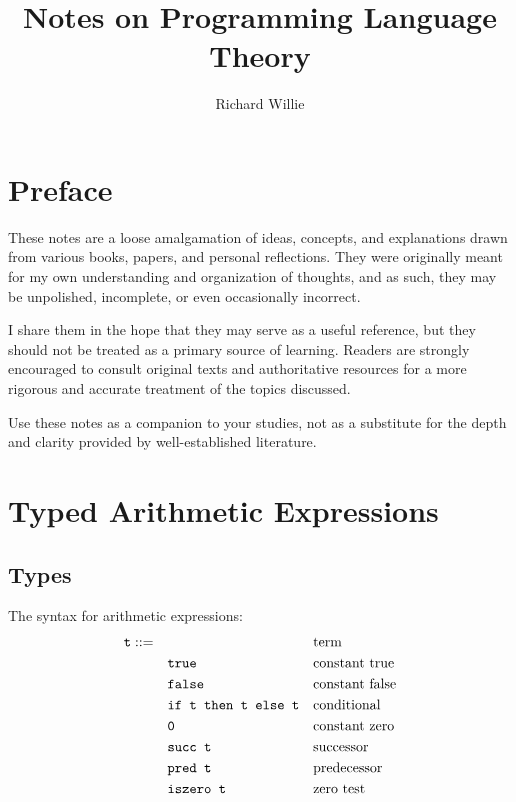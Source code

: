 \documentclass[11pt,twoside=off,numbers=noenddot]{scrbook}
\title{Notes on Programming Language Theory}
\author{Richard Willie}
\begin{document}
\maketitle

\chapter*{Preface}
These notes are a loose amalgamation of ideas, concepts, and
explanations drawn from various books, papers, and personal
reflections. They were originally meant for my own understanding and
organization of thoughts, and as such, they may be unpolished,
incomplete, or even occasionally incorrect.

I share them in the hope that they may serve as a useful reference,
but they should not be treated as a primary source of learning.
Readers are strongly encouraged to consult original texts and
authoritative resources for a more rigorous and accurate treatment of
the topics discussed.

Use these notes as a companion to your studies, not as a substitute
for the depth and clarity provided by well-established literature.

\tableofcontents

\newpage

\chapter{Typed Arithmetic Expressions}

\section{Types}
The syntax for arithmetic expressions:
\begin{align*}
  \texttt{t} ::= & \quad && \text{term} \\
  & \quad \texttt{true} && \text{constant true} \\
  & \quad \texttt{false} && \text{constant false} \\
  & \quad \texttt{if t then t else t} && \text{conditional} \\
  & \quad \texttt{0} && \text{constant zero} \\
  & \quad \texttt{succ t} && \text{successor} \\
  & \quad \texttt{pred t} && \text{predecessor} \\
  & \quad \texttt{iszero t} && \text{zero test}
\end{align*}
\end{document}
